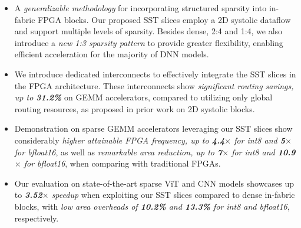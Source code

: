 \vspace{-0.10cm}
\begin{itemize}
  \item  A \textit{generalizable methodology} for incorporating structured sparsity into in-fabric FPGA blocks. Our proposed SST slices employ a 2D systolic dataflow and support multiple levels of sparsity. Besides dense, 2:4 and 1:4, we also introduce a \textit{new 1:3 sparsity pattern} to provide greater flexibility, enabling efficient acceleration for the majority of DNN models.
  \item  We introduce dedicated interconnects to effectively integrate the SST slices in the FPGA architecture. These interconnects show \textit{significant routing savings, up to \textbf{31.2\%}} on GEMM accelerators, compared to utilizing only global routing resources, as proposed in prior work on 2D systolic blocks.
  \item Demonstration on sparse GEMM accelerators leveraging our SST slices show considerably \textit{higher attainable FPGA frequency, up to \textbf{4.4$\times$} for int8 and \textbf{5$\times$} for bfloat16}, as well as \textit{remarkable area reduction, up to \textbf{7$\times$} for int8 and \textbf{10.9$\times$} for bfloat16}, when comparing with traditional FPGAs.
  \item Our evaluation on state-of-the-art sparse ViT and CNN models showcases up to \textit{\textbf{3.52$\times$} speedup} when exploiting our SST slices compared to dense in-fabric blocks, with \textit{low area overheads of \textbf{10.2\%} and \textbf{13.3\%} for int8 and bfloat16}, respectively.
\end{itemize}
\vspace{-0.20cm}


